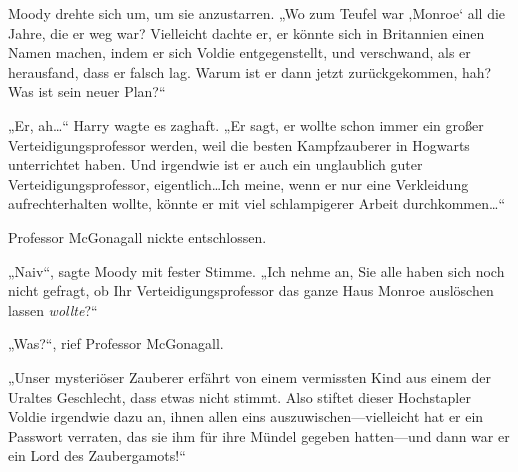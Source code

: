 Moody drehte sich um, um sie anzustarren. „Wo zum Teufel war ‚Monroe‘ all die Jahre, die er weg war? Vielleicht dachte er, er könnte sich in Britannien einen Namen machen, indem er sich Voldie entgegenstellt, und verschwand, als er herausfand, dass er falsch lag. Warum ist er dann jetzt zurückgekommen, hah? Was ist sein neuer Plan?“

„Er, ah…“ Harry wagte es zaghaft. „Er sagt, er wollte schon immer ein großer Verteidigungsprofessor werden, weil die besten Kampfzauberer in Hogwarts unterrichtet haben. Und irgendwie ist er auch ein unglaublich guter Verteidigungsprofessor, eigentlich…Ich meine, wenn er nur eine Verkleidung aufrechterhalten wollte, könnte er mit viel schlampigerer Arbeit durchkommen…“

Professor McGonagall nickte entschlossen.

„Naiv“, sagte Moody mit fester Stimme. „Ich nehme an, Sie alle haben sich noch nicht gefragt, ob Ihr Verteidigungsprofessor das ganze Haus Monroe auslöschen lassen \emph{wollte}?“

„Was?“, rief Professor McGonagall.

„Unser mysteriöser Zauberer erfährt von einem vermissten Kind aus einem der Uraltes Geschlecht, dass etwas nicht stimmt. Also stiftet dieser Hochstapler Voldie irgendwie dazu an, ihnen allen eins auszuwischen—vielleicht hat er ein Passwort verraten, das sie ihm für ihre Mündel gegeben hatten—und dann war er ein Lord des Zaubergamots!“

